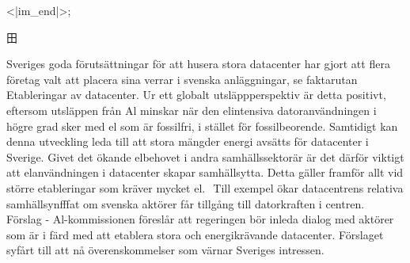 {{{{{{{{{{{{{{<|im_end|>};

田

Sveriges goda förutsättningar för att husera stora datacenter har gjort att flera företag valt att placera sina verrar i svenska anläggningar, se faktarutan Etableringar av datacenter. Ur ett globalt utsläppperspektiv är detta positivt, eftersom utsläppen från Al minskar när den elintensiva datoranvändningen i högre grad sker med el som är fossilfri, i stället för fossilbeorende. Samtidigt kan denna utveckling leda till att stora mängder energi avsätts för datacenter i Sverige. Givet det ökande elbehovet i andra samhällssektorär är det därför viktigt att elanvändningen i datacenter skapar samhällsytta. Detta gäller framför
allt vid större etableringar som kräver mycket el. \({ }^{}\) Till exempel ökar datacentrens relativa samhällsynfffat om svenska aktörer får tillgång till datorkraften i centren. \({ }^{}\)
Förslag
- Al-kommissionen föreslår att regeringen bör inleda dialog med aktörer som är i färd med att etablera stora och energikrävande datacenter. Förslaget syfårt till att nå överenskommelser som värnar Sveriges intressen.
}}}}}}}}}}}}}
